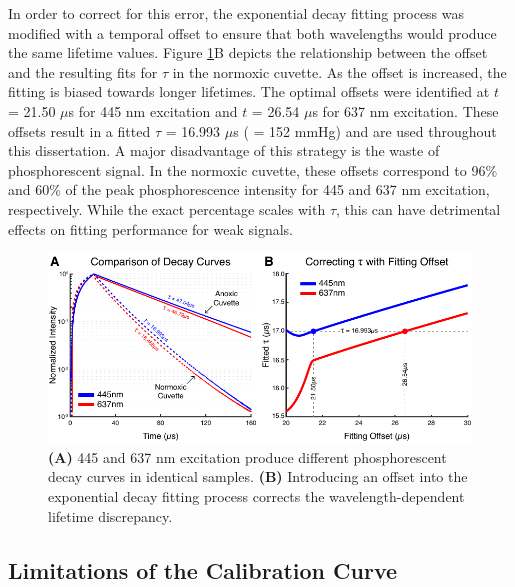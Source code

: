 In order to correct for this error, the exponential decay fitting process was modified with a temporal offset to ensure that both wavelengths would produce the same lifetime values. Figure \ref{fig:offsetcorrection}B depicts the relationship between the offset and the resulting fits for $\tau$ in the normoxic cuvette. As the offset is increased, the fitting is biased towards longer lifetimes. The optimal offsets were identified at $t$ = 21.50 $\mu$s for 445 nm excitation and $t$ = 26.54 $\mu$s for 637 nm excitation. These offsets result in a fitted $\tau$ = 16.993 $\mu$s ( = 152 mmHg) and are used throughout this dissertation. A major disadvantage of this strategy is the waste of phosphorescent signal. In the normoxic cuvette, these offsets correspond to 96\% and 60\% of the peak phosphorescence intensity for 445 and 637 nm excitation, respectively. While the exact percentage scales with $\tau$, this can have detrimental effects on fitting performance for weak signals.

\begin{figure}
    \includegraphics{figures/chapter_2/offsetcorrection.pdf}
    \caption {
        \label{fig:offsetcorrection}
        \textbf{(A)} 445 and 637 nm excitation produce different phosphorescent decay curves in identical samples. \textbf{(B)} Introducing an offset into the exponential decay fitting process corrects the wavelength-dependent lifetime discrepancy.
    }
\end{figure}

\subsection{Limitations of the Calibration Curve}


